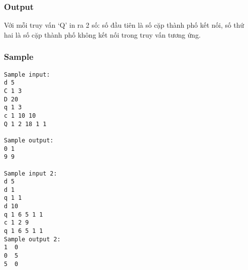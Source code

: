 \subsubsection{Output}

Với mỗi truy vấn ‘Q’ in ra 2 số: số đầu tiên là số cặp thành phố kết nối, số thứ hai là số cặp thành phố không kết nối trong truy vấn tương ứng.

\subsubsection{Sample}
\begin{verbatim}
Sample input: 
d 5 
C 1 3 
D 20 
q 1 3 
c 1 10 10 
Q 1 2 18 1 1 

Sample output: 
0 1 
9 9  

Sample input 2:
d 5
d 1
q 1 1
d 10
q 1 6 5 1 1
c 1 2 9
q 1 6 5 1 1
Sample output 2:
1  0
0  5
5  0
\end{verbatim}

 

 

 

